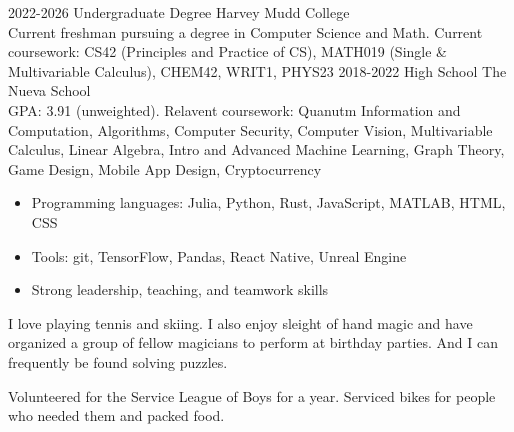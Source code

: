 \documentclass[9pt]{developercv} %
\begin{document}
\begin{entrylist}
	\entry
		{2022-2026}
		{Undergraduate Degree}
		{Harvey Mudd College}
		{\\Current freshman pursuing a degree in Computer Science and Math. Current coursework: CS42 (Principles and Practice of CS), MATH019 (Single \& Multivariable Calculus), CHEM42, WRIT1, PHYS23}
	\entry
		{2018-2022}
		{High School}
		{The Nueva School}
		{\\GPA: 3.91 (unweighted). Relavent coursework: Quanutm Information and Computation, Algorithms, Computer Security, Computer Vision, Multivariable Calculus, Linear Algebra, Intro and Advanced Machine Learning, Graph Theory, Game Design, Mobile App Design, Cryptocurrency}
\end{entrylist}



\begin{itemize}[noitemsep, topsep=0pt]
	\item Programming languages: Julia, Python, Rust, JavaScript, MATLAB, HTML, CSS
	\item Tools: git, TensorFlow, Pandas, React Native, Unreal Engine 
	\item Strong leadership, teaching, and teamwork skills
\end{itemize}

\vspace{0.4cm}
\begin{minipage}[t]{0.6\textwidth}
	\vspace{-\baselineskip} %
	
	I love playing tennis and skiing. I also enjoy sleight of hand magic and have organized a group of fellow magicians to perform at birthday parties.
	And I can frequently be found solving puzzles.
\end{minipage}
\hfill
\begin{minipage}[t]{0.35\textwidth}
	\vspace{-\baselineskip} %
	
	Volunteered for the Service League of Boys for a year. Serviced bikes for people who needed them and packed food. 
\end{minipage}

\end{document}
